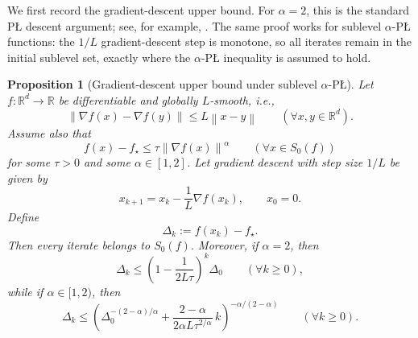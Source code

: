 \documentclass[11pt]{article}
\newtheorem{proposition}[theorem]{Proposition}
\newcommand{\R}{\mathbb{R}}
\newcommand{\norm}[1]{\left\lVert #1\right\rVert}
\newcommand{\gap}{\Delta}
\begin{document}
We first record the gradient-descent upper bound. For \(\alpha=2\), this is the standard P\L{} descent argument; see, for example, \citet{KarimiNutiniSchmidt2016}. The same proof works for sublevel \(\alpha\)-P\L{} functions: the \(1/L\) gradient-descent step is monotone, so all iterates remain in the initial sublevel set, exactly where the \(\alpha\)-P\L{} inequality is assumed to hold.

\begin{proposition}[Gradient-descent upper bound under sublevel $\alpha$-P\L{}]
\label{prop:gd-recursion}
Let $f:\R^d\to\R$ be differentiable and globally $L$-smooth, i.e.,
\[
\norm{\nabla f(x)-\nabla f(y)}\le L\norm{x-y}
\qquad (\forall x,y\in\R^d).
\]
Assume also that
\[
f(x)-f_\star\le \tau \norm{\nabla f(x)}^\alpha
\qquad (\forall x\in S_0(f))
\]
for some $\tau>0$ and some $\alpha\in[1,2]$.
Let gradient descent with step size $1/L$ be given by
\[
x_{k+1}=x_k-\frac1L\nabla f(x_k),
\qquad
x_0=0.
\]
Define
\[
\gap_k:=f(x_k)-f_\star.
\]
Then every iterate belongs to $S_0(f)$. Moreover, if $\alpha=2$, then
\[
\gap_k\le \left(1-\frac{1}{2L\tau}\right)^k\gap_0
\qquad (\forall k\ge 0),
\]
while if $\alpha\in[1,2)$, then
\[
\gap_k
\le
\left(
\gap_0^{-(2-\alpha)/\alpha}
+
\frac{2-\alpha}{2\alpha L\tau^{2/\alpha}}\,k
\right)^{-\alpha/(2-\alpha)}
\qquad (\forall k\ge 0).
\]
\end{proposition}
\end{document}
